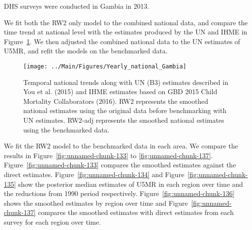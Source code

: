 \documentclass[12pt]{article}\usepackage[]{graphicx}\usepackage[]{color}
\newenvironment{knitrout}{}{} %
\begin{document}


DHS surveys were conducted in Gambia in 2013.

We fit both the RW2 only model to the combined national data, and compare the time trend at national level with the estimates produced by the UN and IHME in Figure~\ref{fig:unnamed-chunk-132}. We then adjusted the combined national data to the UN estimates of U5MR, and refit the models on the benchmarked data. 

\begin{knitrout}
\color{fgcolor}\begin{figure}[bht]

{\centering \texttt{[image: ../Main/Figures/Yearly\_national\_Gambia]} 

}

\caption[Temporal national trends along with UN (B3) estimates described in You et al]{Temporal national trends along with UN (B3) estimates described in You et al. (2015) and IHME estimates based on GBD 2015 Child Mortality Collaborators (2016). RW2 represents the smoothed national estimates using the original data before benchmarking with UN estimates. RW2-adj represents the smoothed national estimates using the benchmarked data.}\label{fig:unnamed-chunk-132}
\end{figure}


\end{knitrout}
 

We fit the RW2 model to the benchmarked data in each area. 
We compare the results in Figure~\ref{fig:unnamed-chunk-133} to \ref{fig:unnamed-chunk-137}.
Figure~\ref{fig:unnamed-chunk-133} compares the smoothed estimates against the direct estimates. Figure~\ref{fig:unnamed-chunk-134} and Figure~\ref{fig:unnamed-chunk-135} show the posterior median estimates of U5MR in each region over time and the reductions from 1990 period respectively.
Figure~\ref{fig:unnamed-chunk-136} shows the smoothed estimates by region over time and Figure~\ref{fig:unnamed-chunk-137} compares the smoothed estimates with direct estimates from each survey for each region over time.


\end{document}
